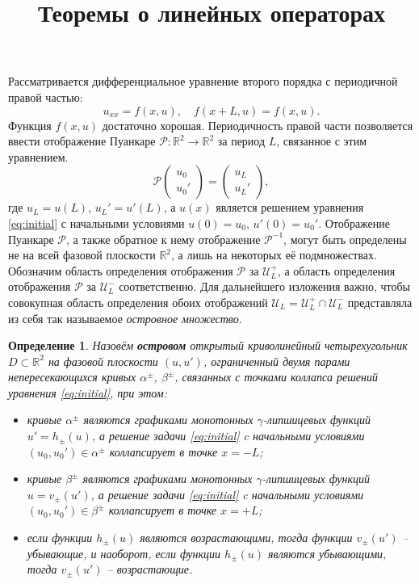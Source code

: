 \documentclass{article}
\newtheorem*{definition}{Определение}
\begin{document}
\title{Теоремы о линейных операторах}

\maketitle

Рассматривается дифференциальное уравнение второго порядка с периодичной правой частью:
\begin{equation}
	u_{xx} = f(x, u), \quad f(x + L, u) = f(x, u).
\label{eq:initial}
\end{equation}
Функция $f(x, u)$ достаточно хорошая.
Периодичность правой части позволяется ввести отображение Пуанкаре $\mathcal{P}: \mathbb{R}^2 \to \mathbb{R}^2$ за период $L$, связанное с этим уравнением.
\begin{equation}
	\mathcal{P} \begin{pmatrix} u_0 \\ u_0' \end{pmatrix}
	= \begin{pmatrix} u_L \\ u_L' \end{pmatrix},
\end{equation}
где $u_L = u(L)$, $u_L' = u'(L)$, а $u(x)$ является решением уравнения \eqref{eq:initial} с начальными условиями $u(0) = u_0$, $u'(0) = u_0'$.
Отображение Пуанкаре $\mathcal{P}$, а также обратное к нему отображение $\mathcal{P}^{-1}$, могут быть определены не на всей фазовой плоскости $\mathbb{R}^2$, а лишь на некоторых её подмножествах.
Обозначим область определения отображения $\mathcal{P}$ за $\mathscr{U}_L^+$, а область определения отображения $\mathcal{P}$ за $\mathscr{U}_L^-$ соответственно.
Для дальнейшего изложения важно, чтобы совокупная область определения обоих отображений $\mathscr{U}_L = \mathscr{U}_L^+ \cap \mathscr{U}_L^-$ представляла из себя так называемое {\it островное множество}.

\begin{definition}
	Назовём {\bf островом} открытый криволинейный четырехугольник $D \subset \mathbb{R}^2$ на фазовой плоскости $(u, u')$, ограниченный двумя парами непересекающихся кривых $\alpha^{\pm}$, $\beta^{\pm}$, связанных с точками коллапса решений уравнения \eqref{eq:initial}, при этом:
	\begin{itemize}
		\item кривые $\alpha^{\pm}$ являются графиками монотонных $\gamma$-липшицевых функций $u' = h_{\pm}(u)$, а решение задачи \eqref{eq:initial} c начальными условиями $(u_0, u_0') \in \alpha^{\pm}$ коллапсирует в точке $x = -L$;
		\item кривые $\beta^{\pm}$ являются графиками монотонных $\gamma$-липшицевых функций $u = v_{\pm}(u')$, а решение задачи \eqref{eq:initial} c начальными условиями $(u_0, u_0') \in \beta^{\pm}$ коллапсирует в точке $x = +L$;
		\item если функции $h_{\pm}(u)$ являются возрастающими, тогда функции $v_{\pm}(u')$ -- убывающие, и наоборот, если функции $h_{\pm}(u)$ являются убывающими, тогда $v_{\pm}(u')$ -- возрастающие.
	\end{itemize}
\end{definition}
\end{document}
